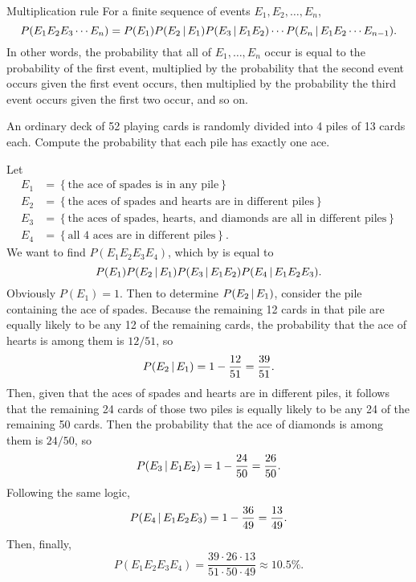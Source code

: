 \begin{bdef}{Multiplication rule}\label{mulrule}
    For a finite sequence of events $E_1, E_2, \dots, E_n$, \[
        P(E_1E_2E_3\cdots E_n) = P(E_1)P(E_2\,\vert\, E_1)P(E_3\,\vert\, E_1E_2)\cdots P(E_n\,\vert\, E_1E_2\cdots E_{n-1}).    
    \] In other words, the probability that all of $E_1, \dots, E_n$ occur is equal to the probability of the first event, multiplied by the probability that the second event occurs given the first event occurs, then multiplied by the probability the third event occurs given the first two occur, and so on.
\end{bdef}

\begin{changebar}
    \begin{example}
        An ordinary deck of 52 playing cards is randomly divided into 4 piles of 13 cards each. Compute the probability that each pile has exactly one ace.
    \end{example}
    \begin{solution}
        Let \[
            \begin{aligned}
                E_1 &= \left\{ \text{the ace of spades is in any pile} \right\} \\
                E_2 &= \left\{ \text{the aces of spades and hearts are in different piles} \right\} \\
                E_3 &= \left\{ \text{the aces of spades, hearts, and diamonds are all in different piles} \right\} \\
                E_4 &= \left\{ \text{all 4 aces are in different piles} \right\}.
            \end{aligned}    
        \] We want to find $P(E_1E_2E_3E_4)$, which by  is equal to \[
            P(E_1)P(E_2\,\vert\, E_1)P(E_3 \,\vert\, E_1E_2)P(E_4 \,\vert\, E_1E_2E_3).    
        \] Obviously $P(E_1) = 1$. Then to determine $P(E_2 \,\vert\, E_1)$, consider the pile containing the ace of spades. Because the remaining 12 cards in that pile are equally likely to be any 12 of the remaining cards, the probability that the ace of hearts is among them is $12/51$, so \[
            P(E_2 \,\vert\, E_1) = 1 - \frac{12}{51} = \frac{39}{51}.    
        \] Then, given that the aces of spades and hearts are in different piles, it follows that the remaining 24 cards of those two piles is equally likely to be any 24 of the remaining 50 cards. Then the probability that the ace of diamonds is among them is $24/50$, so \[
            P(E_3 \,\vert\, E_1E_2) = 1 - \frac{24}{50} = \frac{26}{50}.    
        \] Following the same logic, \[
            P(E_4 \,\vert\, E_1E_2E_3) = 1 - \frac{36}{49} = \frac{13}{49}.    
        \] Then, finally, \[
            P(E_1E_2E_3E_4) = \frac{39\cdot 26 \cdot 13}{51 \cdot 50 \cdot 49} \approx 10.5\%.    
        \]
    \end{solution}
\end{changebar}

